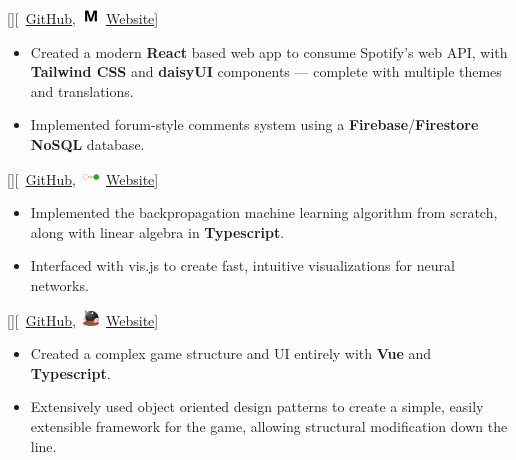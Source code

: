 \documentclass{article}
\begin{document}
\vspace*{\fill}


[][\faGithub\
	\href{https://github.com/kinseyda/muziko}{GitHub},\
	\includegraphics[height=1.5ex]{muziko-icon-small.png}\
	\href{https://kinseyda.github.io/muziko/}{Website}]

\begin{itemize}
	\item Created a modern \textbf{React} based web app to consume Spotify's web
	      API, with \textbf{Tailwind CSS} and \textbf{daisyUI} components ---
	      complete with multiple themes and translations.
	\item Implemented forum-style comments system using a
	      \textbf{Firebase}/\textbf{Firestore} \textbf{NoSQL} database.
\end{itemize}

\experience{Neural Playground}[][\faGithub\
	\href{https://github.com/kinseyda/neural-playground}{GitHub},\
	\includegraphics[height=1.5ex]{neural-icon-small.png}\
	\href{https://kinseyda.github.io/neural-playground/}{Website}]

\begin{itemize}
	\item Implemented the backpropagation machine learning algorithm from
	      scratch, along with linear algebra in \textbf{Typescript}.
	\item Interfaced with vis.js to create fast, intuitive visualizations for
	      neural networks.
\end{itemize}

\experience{Moles}[][\faGithub\
	\href{https://github.com/kinseyda/moles}{GitHub},\
	\includegraphics[height=1.5ex]{mole-icon-small.png}\
	\href{https://kinseyda.github.io/moles/}{Website}]

\begin{itemize}
	\item Created a complex game structure and UI entirely with \textbf{Vue} and
	      \textbf{Typescript}.
	\item Extensively used object oriented design patterns to create a simple,
	      easily extensible framework for the game, allowing structural
	      modification down the line.
\end{itemize}
\end{document}
